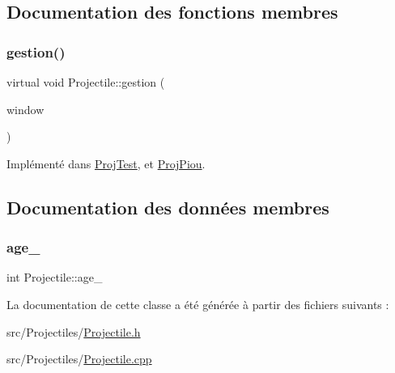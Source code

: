 \subsection{Documentation des fonctions membres}
\mbox{\label{class_projectile_aa969857f9837d9be3a6ea415c9ba3ff1}} 
\subsubsection{\texorpdfstring{gestion()}{gestion()}}
{\footnotesize\ttfamily virtual void Projectile\+::gestion (\begin{DoxyParamCaption}\item[{sf\+::\+Render\+Window \&}]{window }\end{DoxyParamCaption})\hspace{0.3cm}{\ttfamily [pure virtual]}}



Implémenté dans \hyperlink{class_proj_test_af0b751a8e8cb0b7d10857722b691f3b6}{Proj\+Test}, et \hyperlink{class_proj_piou_a964182d333ed2bf64408a7812bc4cd28}{Proj\+Piou}.



\subsection{Documentation des données membres}
\mbox{\label{class_projectile_a1f0a231e002d4796c32ccfeb36c887b1}} 
\subsubsection{\texorpdfstring{age\+\_\+}{age\_}}
{\footnotesize\ttfamily int Projectile\+::age\+\_\+\hspace{0.3cm}{\ttfamily [protected]}}



La documentation de cette classe a été générée à partir des fichiers suivants \+:\begin{DoxyCompactItemize}
\item 
src/\+Projectiles/\hyperlink{_projectile_8h}{Projectile.\+h}\item 
src/\+Projectiles/\hyperlink{_projectile_8cpp}{Projectile.\+cpp}\end{DoxyCompactItemize}
